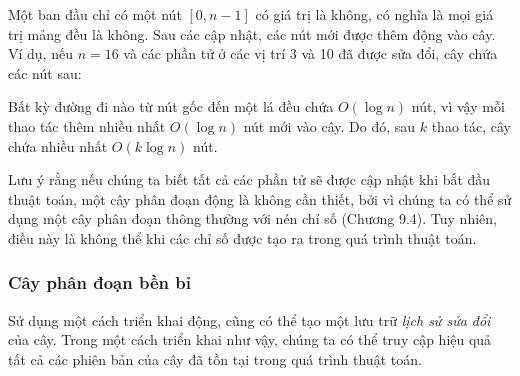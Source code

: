 Một  ban đầu chỉ có
một nút $[0,n-1]$ có giá trị là không,
có nghĩa là mọi giá trị mảng đều là không.
Sau các cập nhật, các nút mới được thêm động
vào cây.
Ví dụ, nếu $n=16$ và các phần tử
ở các vị trí 3 và 10 đã được sửa đổi,
cây chứa các nút sau:
\begin{center}
\end{center}

Bất kỳ đường đi nào từ nút gốc đến một lá đều chứa
$O(\log n)$ nút,
vì vậy mỗi thao tác thêm nhiều nhất $O(\log n)$
nút mới vào cây.
Do đó, sau $k$ thao tác, cây chứa
nhiều nhất $O(k \log n)$ nút.

Lưu ý rằng nếu chúng ta biết tất cả các phần tử sẽ được cập nhật
khi bắt đầu thuật toán,
một cây phân đoạn động là không cần thiết,
bởi vì chúng ta có thể sử dụng một cây phân đoạn thông thường với
nén chỉ số (Chương 9.4).
Tuy nhiên, điều này là không thể khi các chỉ số
được tạo ra trong quá trình thuật toán.

\subsubsection{Cây phân đoạn bền bỉ}


Sử dụng một cách triển khai động,
cũng có thể tạo một
 lưu trữ
\emph{lịch sử sửa đổi} của cây.
Trong một cách triển khai như vậy, chúng ta có thể
truy cập hiệu quả
tất cả các phiên bản của cây đã
tồn tại trong quá trình thuật toán.

